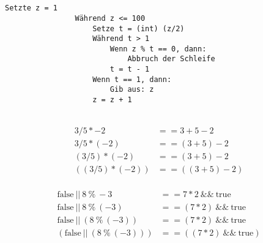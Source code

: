 \documentclass{article}
\begin{document}
    \uebungsblattTitel

    \section*{}
        \subsection{}
            \begin{lstlisting}[autogobble]
                Setzte z = 1
                Während z <= 100
                    Setze t = (int) (z/2)
                    Während t > 1
                        Wenn z % t == 0, dann:
                            Abbruch der Schleife
                        t = t - 1
                    Wenn t == 1, dann:
                        Gib aus: z
                    z = z + 1
            \end{lstlisting}
        \subsection{}
            \begin{align}
                \begin{split}
                    3/5*-2&==3+5-2\\
                    3/5*(-2)&==(3+5)-2\\
                    (3/5)*(-2)&==(3+5)-2\\
                    ((3/5)*(-2))&==((3+5)-2)
                \end{split}
            \end{align}

            \begin{align}
                \begin{split}
                    \text{false}\ ||\ 8\ \%\ -3 &== 7 * 2\ \&\&\ \text{true}\\
                    \text{false}\ ||\ 8\ \%\ (-3) &== (7 * 2)\ \&\&\ \text{true}\\
                    \text{false}\ ||\ (8\ \%\ (-3)) &== (7 * 2)\ \&\&\ \text{true}\\
                    (\text{false}\ ||\ (8\ \%\ (-3))) &== ((7 * 2)\ \&\&\ \text{true})
                \end{split}
            \end{align}

        \subsection{}

        \subsection{}
            
\end{document}
